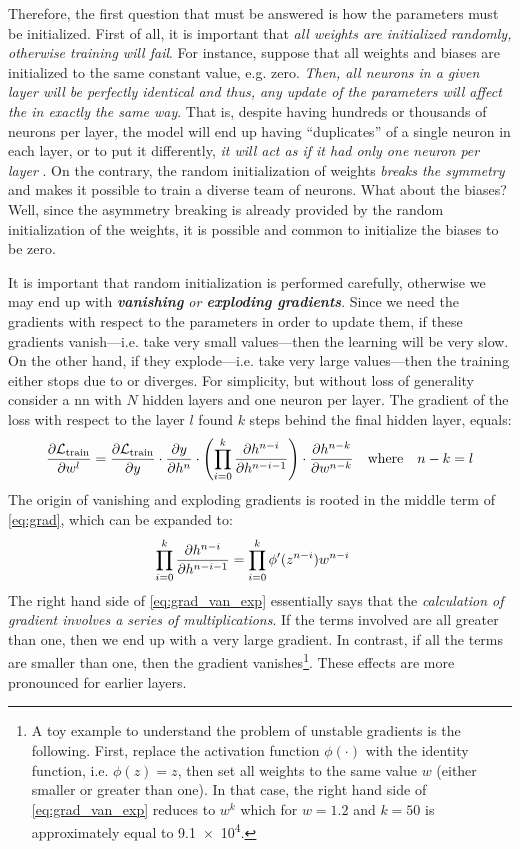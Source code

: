 Therefore, the first question that must be answered is how the parameters must
be initialized. First of all, it is important that \emph{all weights are
initialized randomly, otherwise training will fail}. For instance, suppose that
all weights and biases are initialized to the same constant value, e.g. zero.
\emph{Then, all neurons in a given layer will be perfectly identical and thus,
any update of the parameters will affect the in exactly the same way}. That is,
despite having hundreds or thousands of neurons per layer, the model will end up
having ``duplicates'' of a single neuron in each layer, or to put it
differently, \emph{it will act as if it had only one neuron per layer}
\parencite{ml}. On the contrary, the random initialization of weights
\emph{breaks the symmetry} and makes it possible to train a diverse team of
neurons. What about the biases? Well, since the asymmetry breaking is already
provided by the random initialization of the weights, it is possible and common
to initialize the biases to be zero.

It is important that random initialization is performed carefully, otherwise we
may end up with \emph{\textbf{vanishing} or \textbf{exploding
gradients}}. Since we need
the gradients with respect to the parameters in order to update them, if these
gradients vanish---i.e. take very small values---then the learning will be very
slow. On the other hand, if they explode---i.e. take very large values---then
the training either stops due to  or diverges. For simplicity,
but without loss of generality consider a \gls{nn} with $N$ hidden layers and
one neuron per layer. The gradient of the loss with respect to the layer $l$
found $k$ steps behind the final hidden layer, equals:
\begin{equation}
	\label{eq:grad}
	\frac{\partial \mathcal{L}_\text{train}}{\partial w^l} =
	\frac{\partial \mathcal{L}_\text{train}}{\partial y} \cdot \frac{\partial y}{\partial h^n}
	\cdot
	\left(\prod_{i=0}^k \frac{\partial h^{n-i}}{\partial h^{n-i-1}}\right)
	\cdot
	\frac{\partial h^{n-k}}{\partial w^{n-k}}
	\quad
	\text{where}
	\quad
	n - k = l
\end{equation}
The origin of vanishing and exploding gradients is rooted in the middle term of
\Equation{} \ref{eq:grad}, which can be expanded to:
\begin{equation}
	\label{eq:grad_van_exp}
	\prod_{i=0}^k \frac{\partial h^{n-i}}{\partial h^{n-i-1}} =
	\prod_{i=0}^k \phi'(z^{n-i}) w^{n-i}
	\quad
\end{equation}
The right hand side of \Equation{} \ref{eq:grad_van_exp} essentially says that
the \emph{calculation of gradient involves a series of multiplications}. If the
terms involved are all greater than one, then we end up with a very large
gradient. In contrast, if all the terms are smaller than one, then the gradient
vanishes\footnote{A toy example to understand the problem of unstable gradients
is the following. First, replace the activation function $\phi(\cdot)$ with the
identity function, i.e. $\phi(z) = z$, then set all weights to the same value
$w$ (either smaller or greater than one). In that case, the right hand side of
\Equation{} \ref{eq:grad_van_exp} reduces to $w^k$ which for $w=\num{1.2}$ and
$k=\num{50}$ is approximately equal to \num{9.1e4}.}. These effects are more
pronounced for earlier layers.

